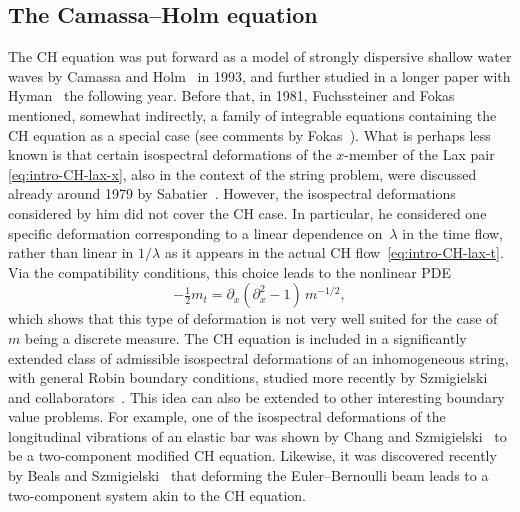 \documentclass[10pt,a4paper]{article} \pdfoutput=1 
\begin{document}
\subsection{The Camassa--Holm equation}
\label{sec:guide-CH}

The CH equation was put forward as a model of strongly dispersive shallow water waves
by Camassa and Holm~\cite{camassa-holm:1993:CH-orginal-paper} in 1993,
and further studied in a longer paper with Hyman~\cite{camassa-holm-hyman:1994:CH-new-integrable}
the following year.
Before that, in 1981, Fuchssteiner and
Fokas~\cite{fuchssteiner-fokas:1981:symplectic-structures-backlund-transformations-hereditary-symmetries,
  fuchssteiner:1981:lie-algebra-structure-nonlinear-evolution-equations-infinite-dimensional-abelian-symmetry-groups}
mentioned, somewhat indirectly, a family of integrable equations containing
the CH equation as a special case
(see comments by Fokas~\cite[p.~146]{fokas:1995:a-class-of-physically-important-integrable-equations}).
What is perhaps less known is that certain isospectral deformations of
the $x$-member of the Lax pair \eqref{eq:intro-CH-lax-x}, also in the
context of the string problem, were discussed already around 1979 by
Sabatier~\cite{sabatier:1980:needs}.
However, the isospectral deformations considered by him did not cover the CH case.
In particular, he considered one  specific deformation corresponding to
a linear dependence on~$\lambda$ in the time flow,
rather than linear in $1/\lambda$ as it appears in the actual CH flow~\eqref{eq:intro-CH-lax-t}.
Via the compatibility conditions, this choice leads to the nonlinear PDE
\begin{equation*}
  -\tfrac12 m_t = \partial_x (\partial_x^2-1) \, m^{-1/2}
  ,
\end{equation*}
which shows that this type of deformation is not very well suited for
the case of $m$ being a discrete measure.
The CH equation is included in a significantly extended
class of admissible isospectral deformations of an inhomogeneous string,
with general Robin boundary conditions, studied more recently by Szmigielski and
collaborators~\cite{colville-gomez-szmigielski:2016:isospectral-deformations-string,gorski-szmigielski:2018:isospectral-flows-inhomogeneous-string}.
This idea can also be extended to other interesting boundary
value problems. For example, one of the isospectral deformations of
the longitudinal vibrations of an elastic bar was shown by Chang and
Szmigielski~\cite{chang-szmigielski:2020:2mCH-overlapping-peakons-elastic-bar-isospectral}
to be a two-component modified CH equation.
Likewise, it was discovered recently by Beals and
Szmigielski~\cite{beals-szmigielski:2021p:2CH-euler-bernoulli-beam-noncommutative-continued-fractions}
that deforming the Euler--Bernoulli beam leads to a two-component
system akin to the CH equation.
\end{document}
